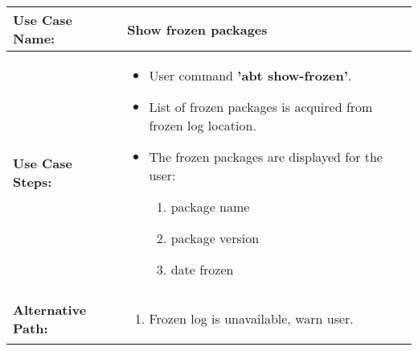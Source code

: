 \medskip

\begin{tabularx}{\linewidth}{|l|X|}
\hline
\textbf{Use Case Name:} & \textbf{Show frozen packages} \\
\hline
\textbf{Use Case Steps:} & 
\begin{minipage}{\linewidth} 
  \vspace{0.05em}
  \begin{itemize}
    \item User command \textbf{'abt show-frozen'}.
    \item List of frozen packages is acquired from frozen log location.
    \item The frozen packages are displayed for the user:
    \begin{enumerate}
      \item package name
      \item package version
      \item date frozen
    \end{enumerate}
  \end{itemize}
  \vspace{0.05em}
\end{minipage}
\\
\hline 
\textbf{Alternative Path:} &
\begin{minipage}{\linewidth}
  \vspace{0.05em} 
  \begin{enumerate}
    \item Frozen log is unavailable, warn user.
  \end{enumerate}
  \vspace{0.05em} 
\end{minipage}
\\
\hline
\end{tabularx}